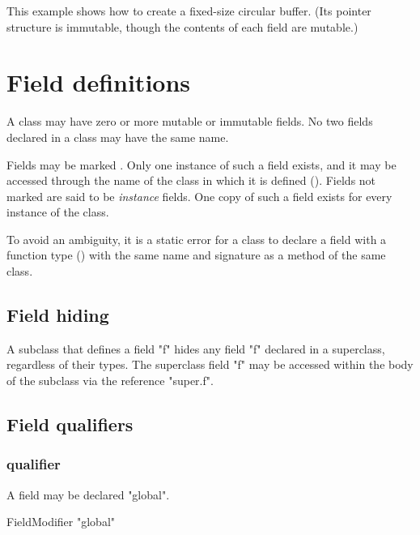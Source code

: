 \begin{example}
This example shows how to create a fixed-size circular buffer.
(Its pointer structure is immutable, though the contents of each
field are mutable.)



\end{example}
\section{Field definitions}
\label{FieldDefinitions}

A class may have zero or more mutable or immutable fields. 
No two fields declared in a class may have the same name. 

Fields may be marked . Only one instance of such a field
exists, and it may be accessed through the name of the class in which
it is defined ().  Fields not marked
 are said to be {\em instance} fields. One copy of such a
field exists for every instance of the class.

To avoid an ambiguity, it is a static error for a class to
declare a field with a function type () with
the same name and signature  as a method of the same class.

\subsection{Field hiding}

A subclass that defines a field \xcd"f" hides any field \xcd"f"
declared in a superclass, regardless of their types.  The
superclass field \xcd"f" may be accessed within the body of
the subclass via the reference \xcd"super.f".

\subsection{Field qualifiers}
\label{FieldQualifier}

\subsubsection{ qualifier}
\label{GlobalField}

A field may be declared \xcd"global".

\begin{grammar}
  FieldModifier \: \xcd"global"  
\end{grammar}

